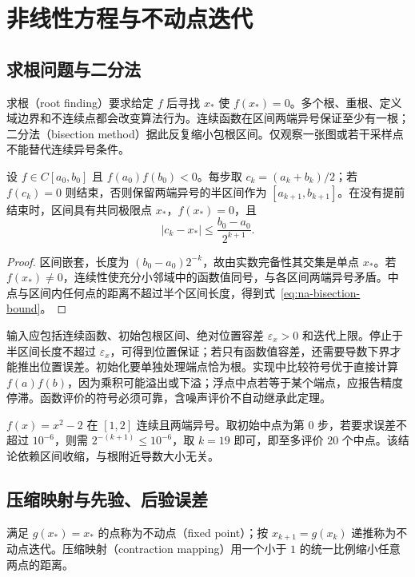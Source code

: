 \setcounter{chapter}{2} %
\chapter{非线性方程与不动点迭代}
\label{chap:na-roots}

\section{求根问题与二分法}
求根（root finding）要求给定 $f$ 后寻找 $x_*$ 使 $f(x_*)=0$。多个根、重根、定义域边界和不连续点都会改变算法行为。连续函数在区间两端异号保证至少有一根；二分法（bisection method）据此反复缩小包根区间。仅观察一张图或若干采样点不能替代连续异号条件。

\begin{theorem}[二分法的误差界]
设 $f\in C[a_0,b_0]$ 且 $f(a_0)f(b_0)<0$。每步取 $c_k=(a_k+b_k)/2$；若 $f(c_k)=0$ 则结束，否则保留两端异号的半区间作为 $[a_{k+1},b_{k+1}]$。在没有提前结束时，区间具有共同极限点 $x_*$，$f(x_*)=0$，且
\begin{equation}
 |c_k-x_*|\le\frac{b_0-a_0}{2^{k+1}}.
 \label{eq:na-bisection-bound}
\end{equation}
\end{theorem}
\begin{proof}
区间嵌套，长度为 $(b_0-a_0)2^{-k}$，故由实数完备性其交集是单点 $x_*$。若 $f(x_*)\ne0$，连续性使充分小邻域中的函数值同号，与各区间两端异号矛盾。中点与区间内任何点的距离不超过半个区间长度，得到式~\eqref{eq:na-bisection-bound}。
\end{proof}

输入应包括连续函数、初始包根区间、绝对位置容差 $\varepsilon_x>0$ 和迭代上限。停止于半区间长度不超过 $\varepsilon_x$，可得到位置保证；若只有函数值容差，还需要导数下界才能推出位置误差。初始化要单独处理端点恰为根。实现中比较符号优于直接计算 $f(a)f(b)$，因为乘积可能溢出或下溢；浮点中点若等于某个端点，应报告精度停滞。函数评价的符号必须可靠，含噪声评价不自动继承此定理。

\begin{example}[计算平方根的包根方法]
$f(x)=x^2-2$ 在 $[1,2]$ 连续且两端异号。取初始中点为第 $0$ 步，若要求误差不超过 $10^{-6}$，则需 $2^{-(k+1)}\le10^{-6}$，取 $k=19$ 即可，即至多评价 $20$ 个中点。该结论依赖区间收缩，与根附近导数大小无关。
\end{example}

\section{压缩映射与先验、后验误差}
满足 $g(x_*)=x_*$ 的点称为不动点（fixed point）；按 $x_{k+1}=g(x_k)$ 递推称为不动点迭代。压缩映射（contraction mapping）用一个小于 $1$ 的统一比例缩小任意两点的距离。

